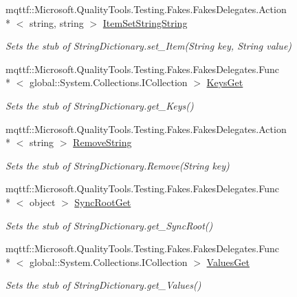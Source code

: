 \begin{DoxyCompactItemize}
mqttf\-::\-Microsoft.\-Quality\-Tools.\-Testing.\-Fakes.\-Fakes\-Delegates.\-Action\\*
$<$ string, string $>$ \hyperlink{class_system_1_1_collections_1_1_specialized_1_1_fakes_1_1_stub_string_dictionary_a8f00e335946cc5d0a0c58fa88250f212}{Item\-Set\-String\-String}
\begin{DoxyCompactList}\small\item\em Sets the stub of String\-Dictionary.\-set\-\_\-\-Item(\-String key, String value)\end{DoxyCompactList}\item 
mqttf\-::\-Microsoft.\-Quality\-Tools.\-Testing.\-Fakes.\-Fakes\-Delegates.\-Func\\*
$<$ global\-::\-System.\-Collections.\-I\-Collection $>$ \hyperlink{class_system_1_1_collections_1_1_specialized_1_1_fakes_1_1_stub_string_dictionary_ad96337d41da989efa6dffa3f79ea802f}{Keys\-Get}
\begin{DoxyCompactList}\small\item\em Sets the stub of String\-Dictionary.\-get\-\_\-\-Keys()\end{DoxyCompactList}\item 
mqttf\-::\-Microsoft.\-Quality\-Tools.\-Testing.\-Fakes.\-Fakes\-Delegates.\-Action\\*
$<$ string $>$ \hyperlink{class_system_1_1_collections_1_1_specialized_1_1_fakes_1_1_stub_string_dictionary_a1dc91359fcfab3c4e8545f58f6fb92b3}{Remove\-String}
\begin{DoxyCompactList}\small\item\em Sets the stub of String\-Dictionary.\-Remove(\-String key)\end{DoxyCompactList}\item 
mqttf\-::\-Microsoft.\-Quality\-Tools.\-Testing.\-Fakes.\-Fakes\-Delegates.\-Func\\*
$<$ object $>$ \hyperlink{class_system_1_1_collections_1_1_specialized_1_1_fakes_1_1_stub_string_dictionary_a7bbdf86948eb72d21b0e8bf3d8e3b9a6}{Sync\-Root\-Get}
\begin{DoxyCompactList}\small\item\em Sets the stub of String\-Dictionary.\-get\-\_\-\-Sync\-Root()\end{DoxyCompactList}\item 
mqttf\-::\-Microsoft.\-Quality\-Tools.\-Testing.\-Fakes.\-Fakes\-Delegates.\-Func\\*
$<$ global\-::\-System.\-Collections.\-I\-Collection $>$ \hyperlink{class_system_1_1_collections_1_1_specialized_1_1_fakes_1_1_stub_string_dictionary_a826e0ba75586b2236a1bb228588adbda}{Values\-Get}
\begin{DoxyCompactList}\small\item\em Sets the stub of String\-Dictionary.\-get\-\_\-\-Values()\end{DoxyCompactList}\end{DoxyCompactItemize}
